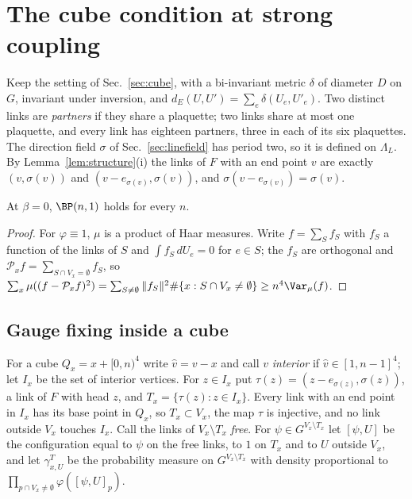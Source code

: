 \section{The cube condition at strong coupling}\label{sec:bpstrong}

Keep the setting of Sec.~\ref{sec:cube}, with a bi-invariant metric $\delta$
of diameter $D$ on $G$, invariant under inversion, and $d_E(U,U')=\sum_e
\delta(U_e,U'_e)$. Two distinct links are \emph{partners} if they share a
plaquette; two links share at most one plaquette, and every link has eighteen
partners, three in each of its six plaquettes. The direction field $\sigma$ of
Sec.~\ref{sec:linefield} has period two, so it is defined on $\Lambda_L$. By
Lemma~\ref{lem:structure}(i) the links of $F$ with an end point $v$ are exactly
$(v,\sigma(v))$ and $(v-e_{\sigma(v)},\sigma(v))$, and $\sigma(v-e_{\sigma(v)})=
\sigma(v)$.

\begin{proposition}\label{prop:bpsup}
At $\beta=0$, $\BP(n,1)$ holds for every $n$.
\end{proposition}

\begin{proof}
For $\varphi\equiv1$, $\mu$ is a product of Haar measures. Write $f=\sum_Sf_S$
with $f_S$ a function of the links of $S$ and $\int f_S\,dU_e=0$ for $e\in S$;
the $f_S$ are orthogonal and $\mathcal P_xf=\sum_{S\cap V_x=\emptyset}f_S$, so
$\sum_x\mu((f-\mathcal P_xf)^2)=\sum_{S\ne\emptyset}\|f_S\|^2\#\{x:S\cap V_x\ne
\emptyset\}\ge n^4\Var_\mu(f)$.
\end{proof}

\subsection*{Gauge fixing inside a cube}
For a cube $Q_x=x+[0,n)^4$ write $\hat v=v-x$ and call $v$ \emph{interior} if
$\hat v\in[1,n-1]^4$; let $I_x$ be the set of interior vertices. For $z\in I_x$
put $\tau(z)=(z-e_{\sigma(z)},\sigma(z))$, a link of $F$ with head $z$, and
$T_x=\{\tau(z):z\in I_x\}$. Every link with an end point in $I_x$ has its base
point in $Q_x$, so $T_x\subset V_x$, the map $\tau$ is injective, and no link
outside $V_x$ touches $I_x$. Call the links of $V_x\setminus T_x$ \emph{free}.
For $\psi\in G^{V_x\setminus T_x}$ let $[\psi,U]$ be the configuration equal to
$\psi$ on the free links, to $1$ on $T_x$ and to $U$ outside $V_x$, and let
$\gamma^T_{x,U}$ be the probability measure on $G^{V_x\setminus T_x}$ with
density proportional to $\prod_{p\cap V_x\ne\emptyset}\varphi([\psi,U]_p)$.

